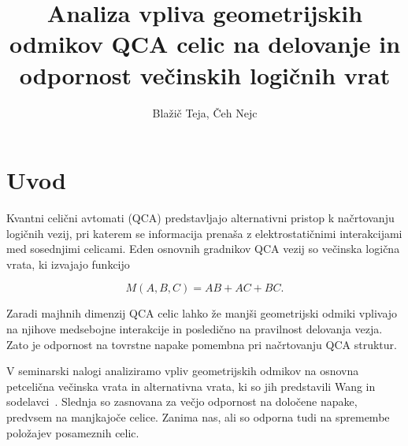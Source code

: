 \documentclass[12pt,a4paper]{article}
\begin{document}
\title{Analiza vpliva geometrijskih odmikov QCA celic na delovanje in
odpornost večinskih logičnih vrat}
\author{Blažič Teja, Čeh Nejc}
\maketitle



\section{Uvod}
\label{g18:sec:uvod}

Kvantni celični avtomati (QCA) predstavljajo alternativni pristop k načrtovanju logičnih vezij, pri katerem se informacija prenaša
z elektrostatičnimi interakcijami med sosednjimi celicami. Eden osnovnih gradnikov QCA vezij so večinska logična vrata, ki izvajajo funkcijo

\begin{equation}
    M(A,B,C) = AB + AC + BC.
    \label{g18:eq:majority}
\end{equation}

Zaradi majhnih dimenzij QCA celic lahko že manjši geometrijski odmiki vplivajo na njihove medsebojne interakcije in posledično na pravilnost delovanja vezja. Zato je odpornost na tovrstne napake pomembna pri načrtovanju QCA struktur.

V seminarski nalogi analiziramo vpliv geometrijskih odmikov na osnovna petcelična večinska vrata in alternativna vrata,
ki so jih predstavili Wang in sodelavci~\cite{g18:wang2018}. Slednja so zasnovana za večjo odpornost na določene napake, predvsem na manjkajoče
celice. Zanima nas, ali so odporna tudi na spremembe položajev posameznih celic.
\end{document}
